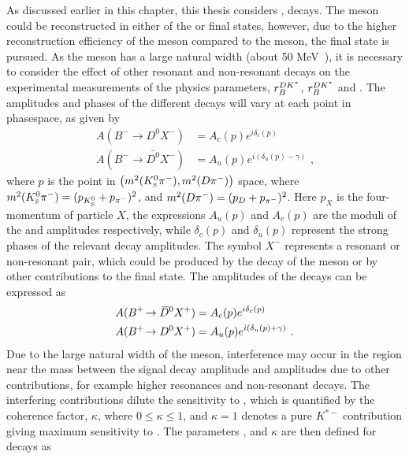 As discussed earlier in this chapter, this thesis considers \decay{\Bm}{\D\Kstarm}, \decay{\Kstarm}{\KS\pim} decays. The \Kstarm meson could be reconstructed in either of the \KS\piz or \Km\piz final states, however, due to the higher reconstruction efficiency of the \KS meson compared to the \piz meson, the \KS\pim final state is pursued. As the \Kstarm meson has a large natural width (about 50 MeV~\cite{PDG2016}), it is necessary to consider the effect of other resonant and non-resonant \decay{\Bm}{\D\KS\pim} decays on the experimental measurements of the physics parameters, $r_B^{DK^*}$, $r_B^{DK^*}$ and \Pgamma. The amplitudes and phases of the different decays will vary at each point in \decay{\Bm}{\D\KS\pim} phasespace, as given by
\begin{align*}
A(B^- \to D^0 X^-) &= A_c(p) e^{i\delta_c(p)} \\
A(B^- \to \bar{D^0} X^-) &= A_u(p) e^{i(\delta_u(p) - \gamma)} \text{ ,}
\end{align*}
where $p$ is the point in $\left(m^2({{K}^0_{\mathrm{ \scriptscriptstyle S}}}{{\pi}^-}),m^2({D}{{\pi}^-})\right)$ space, where $m^2({{K}^0_{\mathrm{ \scriptscriptstyle S}}}{{\pi}^-}) = (p_{{{K}^0_{\mathrm{ \scriptscriptstyle S}}}} + p_{{{\pi}^-}})^2$, and $m^2({D}{{\pi}^-}) = (p_{{D}} + p_{{{\pi}^-}})^2$. Here $p_{X}$ is the four-momentum of particle $X$, the expressions $A_u(p)$ and $A_c(p)$ are the moduli of the \decay{\bquark}{\uquark} and \decay{\bquark}{\cquark} amplitudes respectively, while $\delta_{c}(p)$ and $\delta_{u}(p)$ represent the strong phases of the relevant decay amplitudes. The symbol $X^-$ represents a resonant or non-resonant \KS\pim pair, which could be produced by the decay of the \Kstarm meson or by other contributions to the \decay{\Bm}{\D\KS\pim} final state. The amplitudes of the \Bp decays can be expressed as 
\begin{align*}
A({{{B}^+}}\!\rightarrow {\ensuremath{{\kern 0.2em\overline{\kern -0.2em D}{}}{}^0}} X^+) &= A_c(p) e^{i\delta_c(p)} \\
A({{{B}^+}}\!\rightarrow {\ensuremath{{D}^0}} X^+) &= A_u(p) e^{i(\delta_u(p) + \gamma)} \text{ .}
\end{align*}
Due to the large natural width of the \Kstarm meson, interference may occur in the region near the \Kstarm mass between the signal \Kstarm decay amplitude and amplitudes due to other \decay{\Bm}{\D\KS\pim} contributions, for example higher \KS\pim resonances and non-resonant decays. The interfering contributions dilute the sensitivity to \Pgamma, which is quantified by the \btodkst coherence factor, $\kappa$, where $0 \leq \kappa \leq 1$, and $\kappa = 1$ denotes a pure $K^{*-}$ contribution giving maximum sensitivity to \Pgamma. The parameters \rb, \deltab and $\kappa$ are then defined for \btodkst decays as
